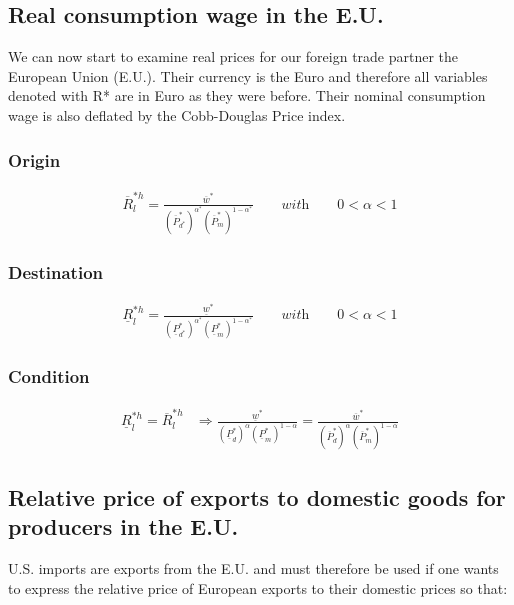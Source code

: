 \subsection*{Real consumption wage in the E.U.} 
We can now start to examine real prices for our foreign trade partner the European Union (E.U.). Their currency is the Euro and therefore all variables denoted with R* are in Euro as they were before. Their nominal consumption wage is also deflated by the Cobb-Douglas Price index.
\subsubsection*{Origin}
\begin{equation}\label{conweu.o}
\begin{aligned}
\overline R^{*h}_l = \frac{\overline w^*}{ \left( \overline P^*_{d^*} \right) ^{\alpha^*}  \left( \overline P^*_m \right) ^{1-\alpha^*}}\qquad \textit{with} \qquad 0 < \alpha < 1 \end{aligned}  \end{equation}

\subsubsection*{Destination}
\begin{equation}\label{conweu.d} 
\begin{aligned}
\underline R^{*h}_l = \frac{\underline w^*}{ \left( \underline P^*_{d^*} \right) ^{\alpha^*}  \left( \underline P^*_m \right) ^{1-\alpha^*}}\qquad \textit{with} \qquad 0 < \alpha < 1 \end{aligned}  \end{equation}

\subsubsection*{Condition}
\begin{equation}\label{conweu.con}
\begin{aligned}
\underline R^{*h}_l = \overline R^{*h}_l &\Rightarrow \frac{\underline w^*}{ \left( \underline P^*_{d} \right) ^{\alpha}  \left( \underline P^*_m \right) ^{1-\alpha}} = \frac{\overline w^*}{ ( \overline P^*_{d}) ^{\alpha}  ( \overline P^*_m ) ^{1-\alpha}}
\end{aligned}  
\end{equation}

\subsection*{Relative price of exports to domestic goods for producers in the E.U.}
U.S. imports are exports from the E.U. and must therefore be used if one wants to express the relative price of European exports to their domestic prices so that:
